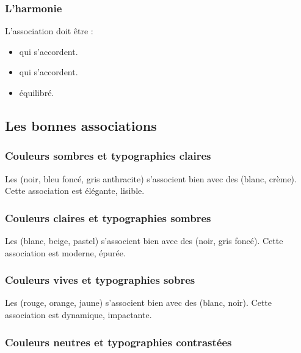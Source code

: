 \subsubsection{L'harmonie}

L'association doit être  :

\begin{itemize}
    \item {} qui s'accordent.
    \item {} qui s'accordent.
    \item {} équilibré.
\end{itemize}

\subsection{Les bonnes associations}

\subsubsection{Couleurs sombres et typographies claires}

Les  (noir, bleu foncé, gris anthracite) s'associent bien avec des  (blanc, crème). Cette association est élégante, lisible.

\subsubsection{Couleurs claires et typographies sombres}

Les  (blanc, beige, pastel) s'associent bien avec des  (noir, gris foncé). Cette association est moderne, épurée.

\subsubsection{Couleurs vives et typographies sobres}

Les  (rouge, orange, jaune) s'associent bien avec des  (blanc, noir). Cette association est dynamique, impactante.

\subsubsection{Couleurs neutres et typographies contrastées}

